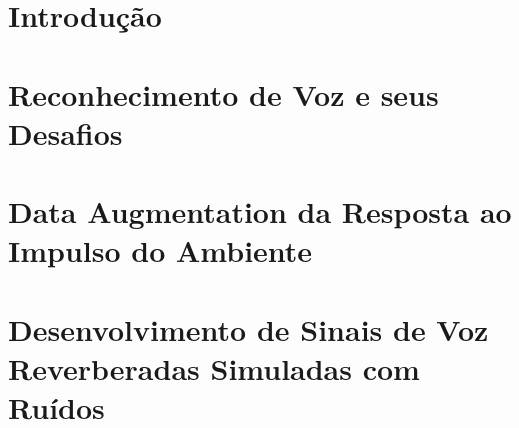 \documentclass[a4paper,12pt,oneside,openany]{book}
\begin{document}
\frontmatter
\thispagestyle{empty}



\pagebreak            



\tableofcontents
\listoffigures
\listoftables

\mainmatter
\cleardoublepage
\chapter{Introdução}
\label{cap1}


\chapter{Reconhecimento de Voz e seus Desafios}
\label{cap2}


\chapter{Data Augmentation da Resposta ao Impulso do Ambiente}
\label{cap3}


\chapter{Desenvolvimento de Sinais de Voz Reverberadas Simuladas com Ruídos}
\label{cap4}

\end{document}
